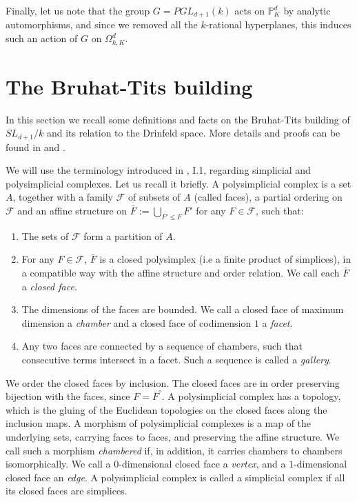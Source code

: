 \documentclass{amsart}
\theoremstyle{theorem}
\theoremstyle{lemma}
\theoremstyle{prop}
\theoremstyle{definition}
\theoremstyle{corollary}
\theoremstyle{remark}
\newcommand{\PR}{\mathbb{P}}
\begin{document}
Finally, let us note that the group $G=PGL_{d+1}(k)$ acts on $\PR^d_K$ by analytic automorphisms, and since we removed all the $k$-rational hyperplanes, this induces such an action of $G$ on  $\Omega^{d}_{k,K}$.


\section{The Bruhat-Tits building}\label{sec:btb}

In this section we recall some definitions and facts on the Bruhat-Tits building of $SL_{d+1}/k$ and its relation to the Drinfeld space. More details and proofs can be found in \cite {ber} and \cite{brt}.

We will use the terminology introduced in \cite{brt}, I.1, regarding simplicial and polysimplicial complexes. Let us recall it briefly. A polysimplicial complex is a set $A$, together with a family $\mathcal{F}$ of subsets of $A$ (called faces), a partial ordering on $\mathcal{F}$ and an affine structure on $\bar{F}:=\bigcup\limits_{F' \leq F} F'$ for any $F\in \mathcal{F}$, such that:
\begin{enumerate}
\item
The sets of $\mathcal{F}$ form a partition of $A$.
\item
For any $F \in \mathcal{F}$, $\bar{F}$ is a closed polysimplex (i.e a finite product of simplices), in a compatible way with the affine structure and order relation.  We call each $\bar{F}$ a \emph{closed face}.
\item
The dimensions of the faces are bounded. We call a closed face of maximum dimension a \emph{chamber} and a closed face of codimension $1$ a \emph{facet}.
\item
Any two faces are connected by a sequence of chambers, such that consecutive terms intersect in a facet. Such a sequence is called a \emph{gallery}.
\end{enumerate}
We order the closed faces by inclusion. The closed faces are in order preserving bijection with the faces, since $F=\bar{F}^{\circ}$.
A polysimplicial complex has a topology, which is the gluing of the Euclidean topologies on the closed faces along the inclusion maps.
A morphism of  polysimplicial complexes is a map of the underlying sets, carrying faces to faces, and preserving the affine structure. We call such a morphism \emph{chambered} if, in addition, it carries chambers to chambers isomorphically. We call a $0$-dimensional closed face a \emph{vertex}, and a $1$-dimensional closed face an \emph{edge}.
A polysimplicial complex is called a simplicial complex if all its closed faces are simplices.
\end{document}
